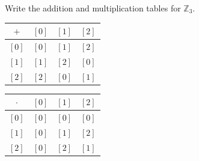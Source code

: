 \documentclass[DIN, pagenumber=false, fontsize=11pt, parskip=half]{scrartcl}
\begin{document}
\begin{problems}
    \problem Write the addition and multiplication tables for $\mathbb{Z}_3$.
    \answer
    \begin{center}
        \begin{tabular}{c|ccc}
            $+$ & $[0]$ & $[1]$ & $[2]$ \\
            \hline
            $[0]$ & $[0]$ & $[1]$ & $[2]$ \\
            $[1]$ & $[1]$ & $[2]$ & $[0]$ \\
            $[2]$ & $[2]$ & $[0]$ & $[1]$ \\
        \end{tabular}
        \qquad
        \begin{tabular}{c|ccc}
            $\cdot$ & $[0]$ & $[1]$ & $[2]$ \\
            \hline
            $[0]$ & $[0]$ & $[0]$ & $[0]$ \\
            $[1]$ & $[0]$ & $[1]$ & $[2]$ \\
            $[2]$ & $[0]$ & $[2]$ & $[1]$ \\
        \end{tabular}
    \end{center}


\end{problems}
\end{document}
